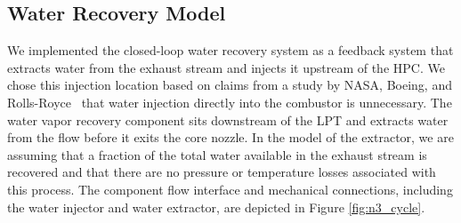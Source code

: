 \documentclass[conf]{new-aiaa}
\begin{document}
\subsection{Water Recovery Model}
We implemented the closed-loop water recovery system as a feedback system that extracts water from the exhaust stream and injects it upstream of the HPC.
We chose this injection location based on claims from a study by NASA, Boeing, and Rolls-Royce~\cite{Daggett2010} that water injection directly into the combustor is unnecessary.
The water vapor recovery component sits downstream of the LPT and extracts water from the flow before it exits the core nozzle.
In the model of the extractor, we are assuming that a fraction of the total water available in the exhaust stream is recovered and that there are no pressure or temperature losses associated with this process.
The component flow interface and mechanical connections, including the water injector and water extractor, are depicted in Figure \ref{fig:n3_cycle}.
\end{document}
